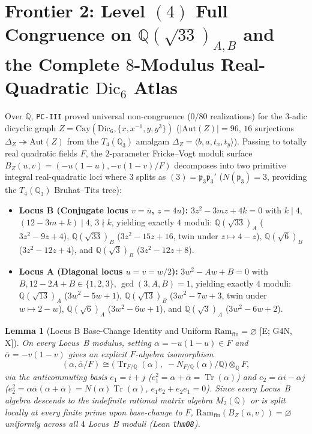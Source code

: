 \documentclass[11pt]{amsart}
\numberwithin{equation}{section}
\theoremstyle{plain}
\newtheorem{lemma}[theorem]{Lemma}
\theoremstyle{definition}\newtheorem{definition}[theorem]{Definition}
\theoremstyle{remark}\newtheorem{remark}[theorem]{Remark}
\newcommand{\Q}{\mathbb{Q}}
\newcommand{\frp}{\mathfrak{p}}
\newcommand{\Aut}{\mathrm{Aut}}
\newcommand{\Cay}{\mathrm{Cay}}
\newcommand{\Dic}{\mathrm{Dic}}
\newcommand{\Ram}{\mathrm{Ram}}
\newcommand{\ctag}[1]{\textup{\textsf{\scriptsize[#1]}}}
\begin{document}
\section{Frontier 2: Level \texorpdfstring{$(4)$}{(4)} Full Congruence on \texorpdfstring{$\Q(\sqrt{33})_{A,B}$}{Q(sqrt(33))A,B} and the Complete \texorpdfstring{$8$}{8}-Modulus Real-Quadratic \texorpdfstring{$\Dic_6$}{Dic6} Atlas}\label{sec:frontier2}

Over $\Q$, \texttt{PC-III} proved universal non-congruence ($0/80$ realizations) for the $3$-adic dicyclic graph $Z = \Cay(\Dic_6, \{x, x^{-1}, y, y^3\})$ ($|\Aut(Z)| = 96$, $16$ surjections $\Delta_Z \twoheadrightarrow \Aut(Z)$ from the $T_4(\Q_3)$ amalgam $\Delta_Z = \langle b, a, t_x, t_y\rangle$). Passing to totally real quadratic fields $F$, the $2$-parameter Fricke--Vogt moduli surface $B_Z(u,v) = (-u(1-u), -v(1-v)/F)$ decomposes into two primitive integral real-quadratic loci where $3$ splits as $(3)=\frp_3\frp_3'$ ($N(\frp_3)=3$, providing the $T_4(\Q_3)$ Bruhat--Tits tree):
\begin{itemize}[nosep]
\item \textbf{Locus B (Conjugate locus $v = \bar{u}$, $z=4u$):} $3z^2 - 3mz + 4k = 0$ with $k \mid 4$, $(12-3m+k) \mid 4$, $3\nmid k$, yielding exactly $4$ moduli:
  $\Q(\sqrt{33})_A$ ($3z^2-9z+4$), $\Q(\sqrt{33})_B$ ($3z^2-15z+16$, twin under $z \mapsto 4-z$), $\Q(\sqrt{6})_B$ ($3z^2-12z+4$), and $\Q(\sqrt{3})_B$ ($3z^2-12z+8$).
\item \textbf{Locus A (Diagonal locus $u = v = w/2$):} $3w^2 - Aw + B = 0$ with $B, 12-2A+B \in \{1,2,3\}$, $\gcd(3,A,B)=1$, yielding exactly $4$ moduli:
  $\Q(\sqrt{13})_A$ ($3w^2-5w+1$), $\Q(\sqrt{13})_B$ ($3w^2-7w+3$, twin under $w\mapsto 2-w$), $\Q(\sqrt{6})_A$ ($3w^2-6w+1$), and $\Q(\sqrt{3})_A$ ($3w^2-6w+2$).
\end{itemize}

\begin{lemma}[Locus B Base-Change Identity and Uniform $\Ram_{\mathrm{fin}}=\varnothing$ \ctag{E; G4N, X}]\label{lem:locus_b_base_change}
On every Locus~B modulus, setting $\alpha = -u(1-u) \in F$ and $\bar{\alpha} = -v(1-v)$ gives an explicit $F$-algebra isomorphism
\begin{equation}\label{eq:base_change}
(\alpha, \bar{\alpha} / F) \cong \bigl(\operatorname{Tr}_{F/\Q}(\alpha),\; -N_{F/\Q}(\alpha) / \Q\bigr) \otimes_{\Q} F,
\end{equation}
via the anticommuting basis $e_1 = i + j$ ($e_1^2 = \alpha+\bar{\alpha} = \operatorname{Tr}(\alpha)$) and $e_2 = \bar{\alpha} i - \alpha j$ ($e_2^2 = \alpha\bar{\alpha}(\alpha+\bar{\alpha}) = N(\alpha)\operatorname{Tr}(\alpha)$, $e_1 e_2 + e_2 e_1 = 0$). Since every Locus~B algebra descends to the indefinite rational matrix algebra $M_2(\Q)$ or is split locally at every finite prime upon base-change to $F$, $\Ram_{\mathrm{fin}}(B_Z(u,v)) = \varnothing$ uniformly across all $4$ Locus~B moduli (Lean \texttt{thm08}).
\end{lemma}
\end{document}
